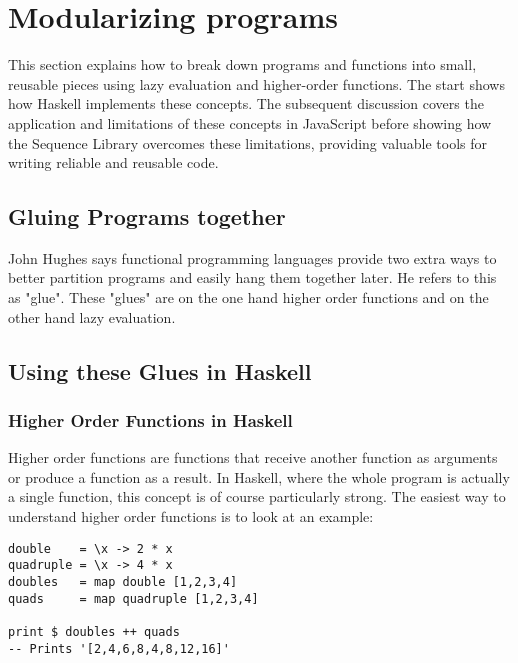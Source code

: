 \section{Modularizing programs}
This section explains how to break down programs and functions into small,
reusable pieces using lazy evaluation and higher-order functions. The start
shows how Haskell implements these concepts. The subsequent discussion covers
the application and limitations of these concepts in JavaScript before showing
how the Sequence Library overcomes these limitations, providing valuable tools
for writing reliable and reusable code.

\subsection{Gluing Programs together} %
\label{sub:Gluing Programs together}

John Hughes says functional programming languages provide two extra ways to
better partition programs and easily hang them together later. He refers to
this as "glue". These "glues" are on the one hand higher order functions and on
the other hand lazy evaluation. \cite{hughes_why_1989}


\subsection{Using these Glues in Haskell} %
\label{sub:Using these Glues in Haskel}

\subsubsection{Higher Order Functions in Haskell} %
\label{sec:Higher order functions Haskell}
Higher order functions are functions that receive another function as arguments
or produce a function as a result. In Haskell, where the whole program is
actually a single function, this concept is of course particularly strong.
The easiest way to understand higher order functions is to look at an
example:

\begin{lstlisting}[style=Haskell, caption=Higher order functions in
Haskell \label{lst:hof_haskell}]
double    = \x -> 2 * x
quadruple = \x -> 4 * x
doubles   = map double [1,2,3,4]
quads     = map quadruple [1,2,3,4]

print $ doubles ++ quads
-- Prints '[2,4,6,8,4,8,12,16]'
\end{lstlisting}

